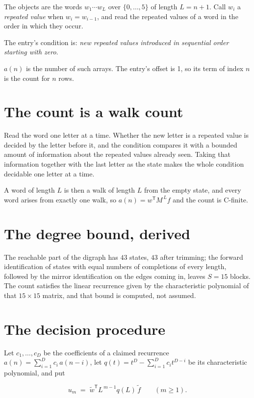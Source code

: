 \documentclass[11pt]{article}
\theoremstyle{definition}
\begin{document}
The objects are the words $w_1\cdots w_L$ over $\{0,\dots,5\}$ of length $L = n + 1$. Call $w_i$ a {\itshape repeated value} when $w_i = w_{i-1}$, and read the repeated values of a word in the order in which they occur.

The entry's condition is: {\itshape new repeated values introduced in sequential order starting with zero}.

$a(n)$ is the number of such arrays. The entry's offset is 1, so its term of index $n$ is the count for $n$ rows.

\section{The count is a walk count}

Read the word one letter at a time. Whether the new letter is a repeated value is decided by the letter before it, and the condition compares it with a bounded amount of information about the repeated values already seen. Taking that information together with the last letter as the state makes the whole condition decidable one letter at a time.

A word of length $L$ is then a walk of length $L$ from the empty state, and every word arises from exactly one walk, so $a(n) = w^{\mathsf T}M^{\,L}f$ and the count is C-finite.

\section{The degree bound, derived}

The reachable part of the digraph has $43$ states, $43$ after trimming; the forward identification of states with equal numbers of completions of every length, followed by the mirror identification on the edges coming in, leaves $S = 15$ blocks. The count satisfies the linear recurrence given by the characteristic polynomial of that $15\times15$ matrix, and that bound is computed, not assumed.

\section{The decision procedure}

Let $c_1,\dots,c_D$ be the coefficients of a claimed recurrence $a(n) = \sum_{i=1}^{D} c_i\,a(n-i)$, let $q(t) = t^{D} - \sum_{i=1}^{D} c_i t^{D-i}$ be its characteristic polynomial, and put

\[u_m \;=\; \tilde w^{\mathsf T} L^{\,m-1} q(L)\,\tilde f \qquad (m \ge 1).\]
\end{document}
